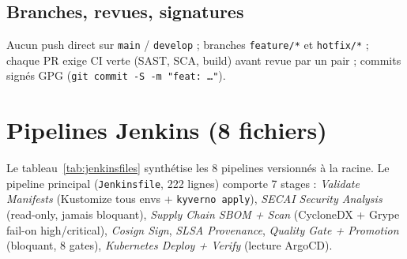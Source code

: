 \documentclass[12pt,a4paper,openany]{report}
\begin{document}
\subsection{Branches, revues, signatures}

Aucun push direct sur \texttt{main} / \texttt{develop} ; branches
\texttt{feature/*} et \texttt{hotfix/*} ; chaque PR exige CI verte (SAST, SCA, build)
avant revue par un pair ; commits signés GPG
(\texttt{git commit -S -m "feat: \dots"}).

\section{Pipelines Jenkins (8 fichiers)}

Le tableau~\ref{tab:jenkinsfiles} synthétise les 8 pipelines versionnés à la racine.
Le pipeline principal (\texttt{Jenkinsfile}, 222 lignes) comporte 7 stages :
\textit{Validate Manifests} (Kustomize tous envs + \texttt{kyverno apply}),
\textit{SECAI Security Analysis} (read-only, jamais bloquant),
\textit{Supply Chain SBOM + Scan} (CycloneDX + Grype fail-on high/critical),
\textit{Cosign Sign}, \textit{SLSA Provenance}, \textit{Quality Gate + Promotion}
(bloquant, 8 gates), \textit{Kubernetes Deploy + Verify} (lecture ArgoCD).
\end{document}

